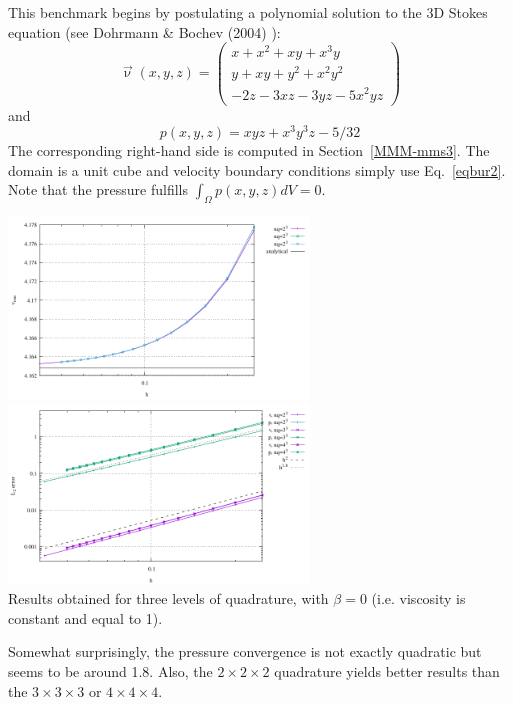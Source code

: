 This benchmark begins by postulating a polynomial solution 
to the 3D Stokes equation (see Dohrmann \& Bochev (2004) \cite{dobo04}):
\begin{equation}
\vec{\upnu}(x,y,z)
=
\left(
\begin{array}{c}
x+x^2+xy+x^3y \\
y + xy + y^2 + x^2 y^2\\
-2z - 3xz - 3yz - 5x^2 yz
\end{array}
\right)
\label{eqbur2}
\end{equation}
and
\begin{equation}
p(x,y,z) = xyz + x^3 y^3z - 5/32
\end{equation}
The corresponding right-hand side is computed in Section~\ref{MMM-mms3}.
The domain is a unit cube and velocity boundary conditions
simply use Eq.~\eqref{eqbur2}.
Note that the pressure fulfills $\int_\Omega p(x,y,z) dV = 0.$

\begin{center}
\includegraphics[width=8cm]{python_codes/fieldstone_82/results/bench1/vrms.pdf}
\includegraphics[width=8cm]{python_codes/fieldstone_82/results/bench1/conv.pdf}\\
{\captionfont Results obtained for three levels of quadrature, with $\beta=0$ (i.e.
viscosity is constant and equal to 1).}
\end{center}

Somewhat surprisingly, the pressure convergence is not exactly quadratic but seems to be
around 1.8. Also, the $2\times 2\times 2$ 
quadrature yields better results than the $3\times 3\times 3$ or $4\times 4 \times 4$.

